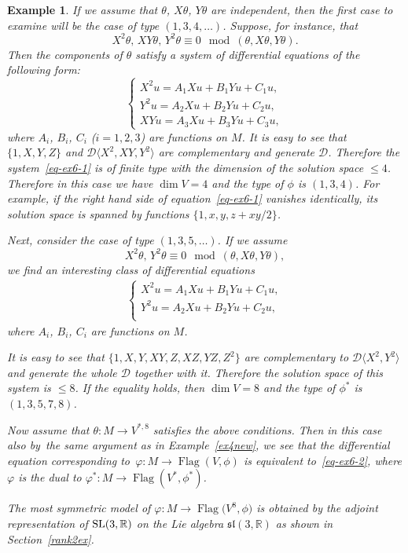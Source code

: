 \documentclass[10pt,a4paper]{amsart}
\newcommand{\R}{\mathbb R}
\newcommand{\cD}{\mathcal D}
\newcommand{\Flag}{\operatorname{Flag}}
\newtheorem{ex}[thm]{Example}
\numberwithin{equation}{section}
\begin{document}
\begin{ex}
	If we assume that $\theta$, $X\theta$, $Y\theta$ are independent, then the first case to examine will be the case of type $(1,3,4,\dots)$. Suppose, for instance, that
	\[
		X^2\theta,\,XY\theta,\, Y^2\theta \equiv 0 \mod (\theta,X\theta,Y\theta).
	\]
	Then the components of $\theta$ satisfy a system of differential equations of the following form:
	\begin{equation}\label{eq-ex6-1}
	\begin{cases}
	X^2u = A_1 Xu+B_1 Yu + C_1u,\\
	Y^2u = A_2 Xu+B_2 Yu + C_2u,\\
	XYu = A_3 Xu+B_3 Yu + C_3u,
	\end{cases}
	\end{equation}
	where $A_i$, $B_i$, $C_i$ ($i=1,2,3$) are functions on $M$. It is easy to see that $\{1,X,Y,Z\}$ and $\cD\big\langle X^2,XY,Y^2\big\rangle$ are complementary and generate $\cD$. Therefore the system~\eqref{eq-ex6-1} is of finite type with the dimension of the solution space $\le 4$. Therefore in this case we have $\dim V=4$ and the type of $\phi$ is $(1,3,4)$. For example, if the right hand side of equation~\eqref{eq-ex6-1} vanishes identically, its solution space is spanned by functions $\{1,x,y,z+xy/2\}$.
	
{\samepage	Next, consider the case of type $(1,3,5,\dots)$. If we assume
	\[
		X^2\theta,\, Y^2\theta \equiv 0 \mod (\theta,X\theta,Y\theta),
	\]
 	we find an interesting class of differential equations
	\begin{gather}\label{eq-ex6-2}
	\begin{cases}
	X^2u = A_1 Xu+B_1 Yu + C_1u,\\
	Y^2u = A_2 Xu+B_2 Yu + C_2u,\\
	\end{cases}
	\end{gather}
	where $A_i$, $B_i$, $C_i$ are functions on $M$.

}
	
	It is easy to see that $\big\{1,X,Y,XY,Z,XZ,YZ,Z^2\big\}$ are complementary to $\cD\big\langle X^2,Y^2\big\rangle$ and generate the whole $\cD$ together with it. Therefore the solution space of this system is $\le 8$. If the equality holds, then $\dim V=8$ and the type of $\phi^*$ is $(1,3,5,7,8)$.
	
	Now assume that $\theta\colon M\to V^{*,8}$ satisfies the above conditions. Then in this case also by~the same argument as in Example~\ref{ex4new}, we see that the differential equation corresponding to~$\varphi\colon M\to \Flag(V,\phi)$ is equivalent to~\eqref{eq-ex6-2}, where $\varphi$ is the dual to $\varphi^*\colon M\to \Flag(V^*,\phi^*)$.
	
	The most symmetric model of $\varphi\colon M\to \Flag\big(V^8,\phi\big)$ is obtained by the adjoint representation of ${\rm SL}(3,\R)$ on the Lie algebra $\mathfrak{sl}(3,\R)$ as shown in Section~\ref{rank2ex}.
\end{ex}
\end{document}
